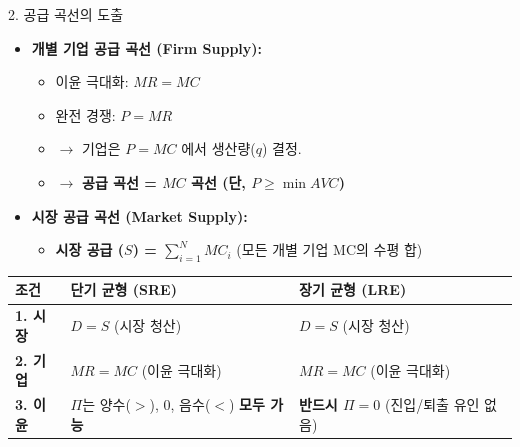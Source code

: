\documentclass[11pt,a4paper]{book}
\theoremstyle{definition}
\begin{document}
\begin{mybox}{2. 공급 곡선의 도출}
\begin{itemize}
    \item \textbf{개별 기업 공급 곡선 (Firm Supply):}
    \begin{itemize}
        \item 이윤 극대화: $MR = MC$
        \item 완전 경쟁: $P = MR$
        \item $\to$ 기업은 $P = MC$ 에서 생산량($q$) 결정.
        \item $\to$ \textbf{공급 곡선 = $MC$ 곡선 (단, $P \ge \min AVC$)}
    \end{itemize}
    \item \textbf{시장 공급 곡선 (Market Supply):}
    \begin{itemize}
        \item \textbf{시장 공급 ($S$) = $\sum_{i=1}^{N} MC_i$} (모든 개별 기업 MC의 수평 합)
    \end{itemize}
\end{itemize}
\end{mybox}

\begin{summarybox}[title={3. 단기 균형 (SRE) vs 장기 균형 (LRE)}]
\begin{tabularx}{\textwidth}{@{}l|X|X@{}}
\toprule
\textbf{조건} & \textbf{단기 균형 (SRE)} & \textbf{장기 균형 (LRE)} \\
\midrule
\textbf{1. 시장} & $D = S$ (시장 청산) & $D = S$ (시장 청산) \\
\midrule
\textbf{2. 기업} & $MR = MC$ (이윤 극대화) & $MR = MC$ (이윤 극대화) \\
\midrule
\textbf{3. 이윤} & $\Pi$는 양수($>$), 0, 음수($<$) \textbf{모두 가능} & \textbf{반드시 $\Pi = 0$} (진입/퇴출 유인 없음) \\
\bottomrule
\end{tabularx}
\end{summarybox}
\end{document}
